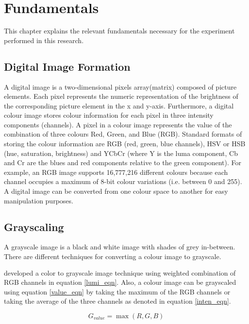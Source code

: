 \chapter{Fundamentals}
\label{cha:Fundamentals}	
This chapter explains the relevant fundamentals necessary for the experiment performed in this research. 

\section{Digital Image Formation}
A digital image is a two-dimensional pixels array(matrix) composed of picture elements. Each pixel represents the numeric representation of the brightness of the corresponding picture element in the x and y-axis. Furthermore, a digital colour image stores colour information for each pixel in three intensity components (channels). A pixel in a colour image represents the value of the combination of three colours Red, Green, and Blue (RGB). Standard formats of storing the colour information are RGB (red, green, blue channels), HSV or HSB (hue, saturation, brightness) and YCbCr (where Y is the luma component, Cb and Cr are the blues and red components relative to the green component). For example, an RGB image supports 16,777,216 different colours because each channel occupies a maximum of 8-bit colour variations (i.e. between 0 and 255). A digital image can be converted from one colour space to another for easy manipulation purposes. 


\section{Grayscaling}
A grayscale image is a black and white image with shades of grey in-between. There are different techniques for converting a colour image to grayscale. 

\cite{pratt2007digital} developed a color to grayscale image technique using weighted combination of RGB channels in equation \ref{lumi_eqn}. Also, a colour image can be grayscaled using equation \ref{value_eqn} by taking the maximum of the RGB channels \cite{acharya2005image} or taking the average of the three channels \cite{jack2007ntsc} as denoted in equation \ref{inten_eqn}.

\begin{equation} \label{value_eqn}
G_{value} = \max (R,G,B)
\end{equation}

